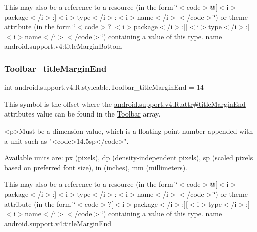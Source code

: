 This may also be a reference to a resource (in the form \char`\"{}$<$code$>$@\mbox{[}$<$i$>$package$<$/i$>$\+:\mbox{]}$<$i$>$type$<$/i$>$\+:$<$i$>$name$<$/i$>$$<$/code$>$\char`\"{}) or theme attribute (in the form \char`\"{}$<$code$>$?\mbox{[}$<$i$>$package$<$/i$>$\+:\mbox{]}\mbox{[}$<$i$>$type$<$/i$>$\+:\mbox{]}$<$i$>$name$<$/i$>$$<$/code$>$\char`\"{}) containing a value of this type.  name android.\+support.\+v4\+:title\+Margin\+Bottom \mbox{\label{classandroid_1_1support_1_1v4_1_1R_1_1styleable_a372ca0431ab4693a3248600ed75e4c10}} 
\subsubsection{\texorpdfstring{Toolbar\+\_\+title\+Margin\+End}{Toolbar\_titleMarginEnd}}
{\footnotesize\ttfamily int android.\+support.\+v4.\+R.\+styleable.\+Toolbar\+\_\+title\+Margin\+End = 14\hspace{0.3cm}{\ttfamily [static]}}

This symbol is the offset where the \hyperlink{classandroid_1_1support_1_1v4_1_1R_1_1attr_afc14c13ceb344e3b222227ab895b9d5d}{android.\+support.\+v4.\+R.\+attr\#title\+Margin\+End} attribute\textquotesingle{}s value can be found in the \hyperlink{classandroid_1_1support_1_1v4_1_1R_1_1styleable_a211358a2f951023c7735caea0fb5ae04}{Toolbar} array.

\begin{DoxyVerb}      <p>Must be a dimension value, which is a floating point number appended with a unit such as "<code>14.5sp</code>".
\end{DoxyVerb}
 Available units are\+: px (pixels), dp (density-\/independent pixels), sp (scaled pixels based on preferred font size), in (inches), mm (millimeters). 

This may also be a reference to a resource (in the form \char`\"{}$<$code$>$@\mbox{[}$<$i$>$package$<$/i$>$\+:\mbox{]}$<$i$>$type$<$/i$>$\+:$<$i$>$name$<$/i$>$$<$/code$>$\char`\"{}) or theme attribute (in the form \char`\"{}$<$code$>$?\mbox{[}$<$i$>$package$<$/i$>$\+:\mbox{]}\mbox{[}$<$i$>$type$<$/i$>$\+:\mbox{]}$<$i$>$name$<$/i$>$$<$/code$>$\char`\"{}) containing a value of this type.  name android.\+support.\+v4\+:title\+Margin\+End \mbox{\label{classandroid_1_1support_1_1v4_1_1R_1_1styleable_acb7d5ee2c69e4de526bd73e36e16b455}} 
